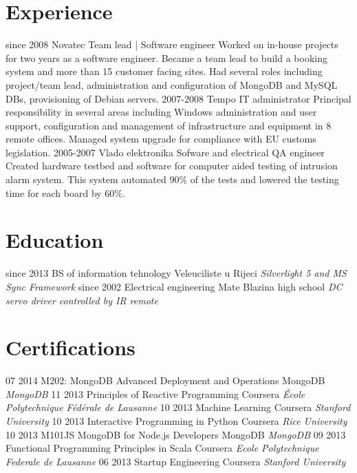 \documentclass[print]{friggeri-cv}
\begin{document}
\section{Experience}

\begin{entrylist}
  \entry
    {since 2008}
    {Novatec}
    {Team lead | Software engineer}
    {Worked on in-house projects for two years as a software engineer. Became a team lead to build a booking system and more than 15 customer facing sites. Had several roles including project/team lead, administration and configuration of MongoDB and MySQL DBs, provisioning of Debian servers.}
  \entry
    {2007-2008}
    {Tempo}
    {IT administrator}
    {Principal responsibility in several areas including Windows administration and user support, configuration and management of infrastructure and equipment in 8 remote offices. Managed system upgrade for compliance with EU customs legislation.}
  \entry
    {2005-2007}
    {Vlado elektronika}
    {Sofware and electrical QA engineer}
    {Created hardware testbed and software for computer aided testing of intrusion alarm system. This system automated 90\% of the tests and lowered the testing time for each board by 60\%.}
\end{entrylist}

\section{Education}

\begin{entrylist}
  \entry
    {since 2013}
    {BS of information tehnology}
    {Veleuciliste u Rijeci}
    {\emph{Silverlight 5 and MS Sync Framework}}
  \entry
    {since 2002}
    {Electrical engineering}
    {Mate Blazina high school}
    {\emph{DC servo driver controlled by IR remote}}
\end{entrylist}
\section{Certifications}
\begin{entrylist}
  \entry
    {07 2014} 
    {M202: MongoDB Advanced Deployment and Operations}
    {MongoDB}
    {\emph{MongoDB}}
  \entry
    {11 2013}
    {Principles of Reactive Programming}
    {Coursera}
    {\emph{École Polytechnique Fédérale de Lausanne}}
  \entry
    {10 2013}
    {Machine Learning} 
    {Coursera}
    {\emph{Stanford University}}
  \entry
    {10 2013}
    {Interactive Programming in Python}
    {Coursera}
    {\emph{Rice University}}
  \entry
    {10 2013}
    {M101JS MongoDB for Node.js Developers}
    {MongoDB}
    {\emph{MongoDB}}
  \entry
    {09 2013}
    {Functional Programming Principles in Scala}
    {Coursera}
    {\emph{Ecole Polytechnique Federale de Lausanne}}
  \entry
    {06 2013}
    {Startup Engineering}
    {Coursera}
    {\emph{Stanford University}}
\end{entrylist}
\end{document}
